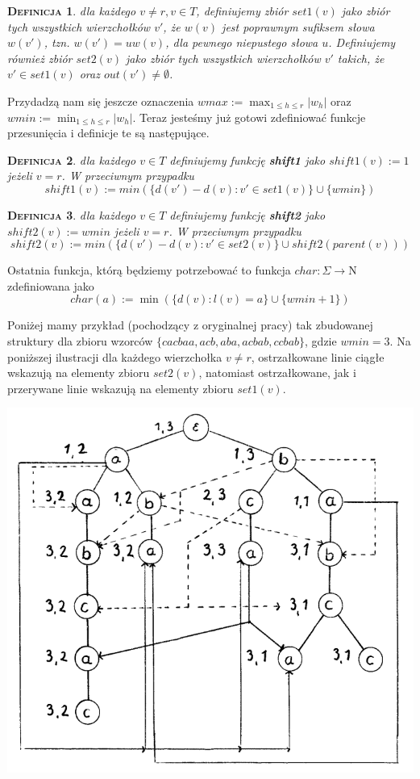\documentclass[a4paper,11pt]{article}
\newtheorem{DEF}{\textsc{Definicja}}[section]
\begin{document}
\begin{DEF}
dla każdego $v \not = r, v \in T$, definiujemy
zbiór $set1(v)$ jako zbiór tych wszystkich wierzchołków $v'$, że $w(v)$ jest poprawnym sufiksem słowa $w(v')$, tzn. $w(v') = uw(v)$, dla pewnego niepustego słowa $u$. Definiujemy również zbiór $set2(v)$ jako zbiór tych wszystkich wierzchołków $v'$ takich, że $v' \in set1(v)$ oraz $out(v') \not = \emptyset$. 
\end{DEF}

\noindent Przydadzą nam się jeszcze oznaczenia $wmax := \max_{1 \leq h \leq r}|w_h|$ oraz $wmin := \min_{1 \leq h \leq r}|w_h|$. Teraz jesteśmy już gotowi zdefiniować funkcje przesunięcia i definicje te są następujące.

\begin{DEF}
dla każdego $v \in T$ definiujemy funkcję \textbf{shift1} jako $shift1(v) := 1$ jeżeli $v=r$. W przeciwnym przypadku $$shift1(v) :=  min \left( \{d(v')-d(v) : v' \in set1(v) \} \cup \{wmin\}\right)$$
\end{DEF}

\begin{DEF}
dla każdego $v \in T$ definiujemy funkcję \textbf{shift2} jako $shift2(v) := wmin$ jeżeli $v=r$. W przeciwnym przypadku $$shift2(v) :=  min \left( \{d(v')-d(v) : v' \in set2(v) \} \cup shift2(parent(v))\right)$$
\end{DEF}

\noindent Ostatnia funkcja, którą będziemy potrzebować to funkcja $char: \Sigma \longrightarrow \mathrm{N}$ zdefiniowana jako $$char(a) := \min (\{ d(v) : l(v) = a \} \cup \{ wmin+1 \})$$

\noindent Poniżej mamy przykład (pochodzący z oryginalnej pracy) tak zbudowanej struktury dla zbioru wzorców $\{cacbaa, acb, aba, acbab, ccbab\}$, gdzie $wmin = 3$. Na poniższej ilustracji dla każdego wierzchołka $v \not = r$, ostrzałkowane linie ciągłe wskazują na elementy zbioru $set2(v)$, natomiast ostrzałkowane, jak i przerywane linie wskazują na elementy zbioru $set1(v)$.

\begin{center}
\includegraphics[scale=0.4]{trie.png}
\end{center}
\end{document}
